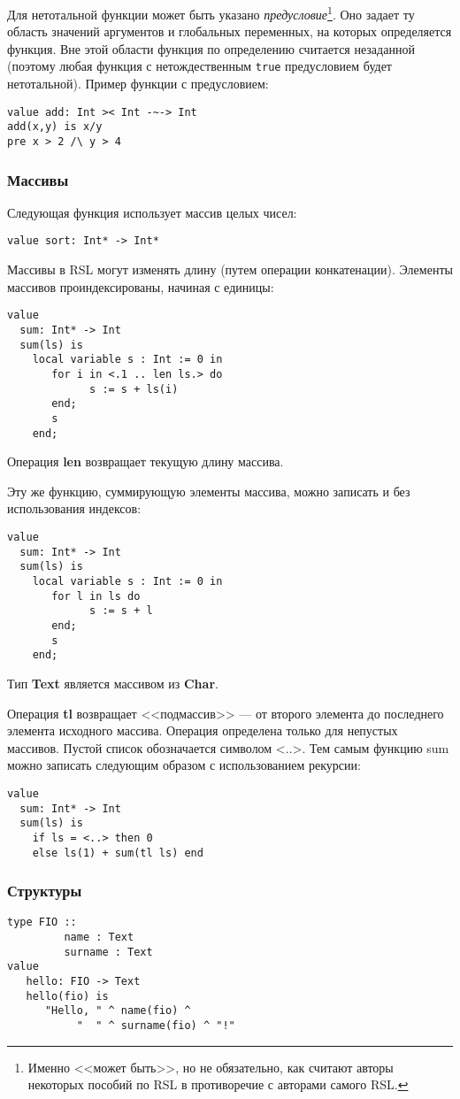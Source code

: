\documentclass[14pt, twoside]{extreport}
\newcommand{\head}[1]{\vspace{1cm}\subsubsection*{#1}}
\begin{document}
Для нетотальной функции может быть указано \emph{предусловие}\footnote{Именно <<может быть>>, но не обязательно, как считают авторы некоторых пособий по RSL в противоречие с авторами самого RSL.}. Оно задает ту область значений аргументов и глобальных переменных, на которых определяется функция. Вне этой области функция по определению считается незаданной (поэтому любая функция с нетождественным \texttt{true} предусловием будет нетотальной). Пример функции с предусловием:
\begin{lstlisting}
value add: Int >< Int -~-> Int
add(x,y) is x/y
pre x > 2 /\ y > 4
\end{lstlisting}


\head{Массивы}
Следующая функция использует массив целых чисел:
\begin{lstlisting}
value sort: Int* -> Int*
\end{lstlisting}

Массивы в RSL могут изменять длину (путем операции конкатенации). Элементы массивов проиндексированы, начиная с единицы:
\begin{lstlisting}
value
  sum: Int* -> Int
  sum(ls) is
    local variable s : Int := 0 in
       for i in <.1 .. len ls.> do
             s := s + ls(i)
       end;
       s
    end;     
\end{lstlisting}

Операция \textbf{len} возвращает текущую длину массива.

Эту же функцию, суммирующую элементы массива, можно записать и без использования индексов:
\begin{lstlisting}
value
  sum: Int* -> Int
  sum(ls) is
    local variable s : Int := 0 in
       for l in ls do
             s := s + l
       end;
       s
    end;     
\end{lstlisting}

Тип \textbf{Text} является массивом из \textbf{Char}.

Операция \textbf{tl} возвращает <<подмассив>> --- от второго элемента до последнего элемента исходного массива. Операция определена только для непустых массивов. Пустой список обозначается символом <..>. Тем самым функцию sum можно записать следующим образом с использованием рекурсии:
\begin{lstlisting}
value
  sum: Int* -> Int
  sum(ls) is
    if ls = <..> then 0
    else ls(1) + sum(tl ls) end
\end{lstlisting}


\head{Структуры}
\begin{lstlisting}
type FIO ::
         name : Text
         surname : Text
value
   hello: FIO -> Text
   hello(fio) is
      "Hello, " ^ name(fio) ^ 
           "  " ^ surname(fio) ^ "!"
\end{lstlisting}
\end{document}
